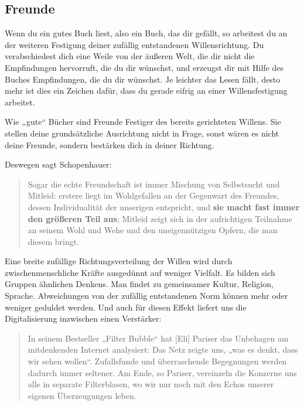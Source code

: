 \documentclass[12pt]{book}
\begin{document}
\subsection{Freunde}

Wenn du ein gutes Buch liest, also ein Buch, das dir gefällt, so arbeitest du an der weiteren Festigung deiner zufällig entstandenen Willensrichtung. Du verabschiedest dich eine Weile von der äußeren Welt, die dir nicht die Empfindungen hervorruft, die du dir wünschst, und erzeugst dir mit Hilfe des Buches Empfindungen, die du dir  wünschst. Je leichter das Lesen fällt, desto mehr ist dies ein Zeichen dafür, dass du gerade eifrig an einer Willensfestigung arbeitet. 

Wie „gute“ Bücher sind Freunde Festiger des bereits gerichteten Willens. Sie stellen deine grundsätzliche Ausrichtung nicht in Frage, sonst wären es nicht deine Freunde, sondern bestärken dich in deiner Richtung. 

Deswegen sagt Schopenhauer:

\begin{quote}\begin{tcolorbox}
Sogar die echte Freundschaft ist immer Mischung von Selbstsucht und Mitleid: erstere liegt im Wohlgefallen an der Gegenwart des Freundes, dessen Individualität der unserigen entspricht, und \textbf{sie macht fast immer den größeren Teil aus}; Mitleid zeigt sich in der aufrichtigen Teilnahme an seinem Wohl und Wehe und den uneigennützigen Opfern, die man diesem bringt.
\end{tcolorbox}\end{quote}

Eine breite zufällige Richtungsverteilung der Willen wird durch zwischenmenschliche Kräfte ausgedünnt auf weniger Vielfalt. Es bilden sich Gruppen ähnlichen Denkens. Man findet zu gemeinsamer Kultur, Religion, Sprache. Abweichungen von der zufällig entstandenen Norm können mehr oder weniger geduldet werden.
Und auch für diesen Effekt liefert uns die Digitalisierung inzwischen einen Verstärker:

\begin{quote}\begin{tcolorbox}
In seinem Bestseller „Filter Bubble“ hat [Eli] Pariser das Unbehagen am mitdenkenden Internet analysiert: Das Netz zeigte uns, „was es denkt, dass wir sehen wollen“. Zufallsfunde und überraschende Begegnungen werden dadurch immer seltener. Am Ende, so Pariser, vereinzeln die Konzerne uns alle in separate Filterblasen, wo wir nur noch mit den Echos unserer eigenen Überzeugungen leben.
\end{tcolorbox}\end{quote}
\end{document}
